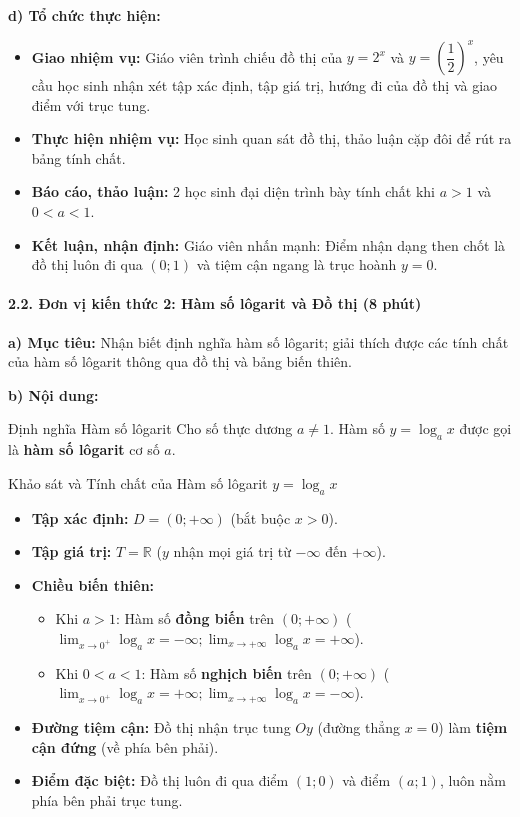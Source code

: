 \documentclass[12pt, a4paper]{article}
\begin{document}
\noindent \textbf{d) Tổ chức thực hiện:}
\begin{itemize}[leftmargin=0.6cm]
    \item \textbf{Giao nhiệm vụ:} Giáo viên trình chiếu đồ thị của $y = 2^x$ và $y = \left(\dfrac{1}{2}\right)^x$, yêu cầu học sinh nhận xét tập xác định, tập giá trị, hướng đi của đồ thị và giao điểm với trục tung.
    \item \textbf{Thực hiện nhiệm vụ:} Học sinh quan sát đồ thị, thảo luận cặp đôi để rút ra bảng tính chất.
    \item \textbf{Báo cáo, thảo luận:} 2 học sinh đại diện trình bày tính chất khi $a > 1$ và $0 < a < 1$.
    \item \textbf{Kết luận, nhận định:} Giáo viên nhấn mạnh: Điểm nhận dạng then chốt là đồ thị luôn đi qua $(0; 1)$ và tiệm cận ngang là trục hoành $y = 0$.
\end{itemize}

\paragraph{2.2. Đơn vị kiến thức 2: Hàm số lôgarit và Đồ thị (8 phút)}

\noindent \textbf{a) Mục tiêu:}
Nhận biết định nghĩa hàm số lôgarit; giải thích được các tính chất của hàm số lôgarit thông qua đồ thị và bảng biến thiên.

\noindent \textbf{b) Nội dung:}
\begin{pedabox}{Định nghĩa Hàm số lôgarit}
Cho số thực dương $a \neq 1$.
Hàm số $y = \log_a x$ được gọi là \textbf{hàm số lôgarit} cơ số $a$.
\end{pedabox}

\begin{pedabox}{Khảo sát và Tính chất của Hàm số lôgarit $y = \log_a x$}
\begin{itemize}[leftmargin=0.6cm]
    \item \textbf{Tập xác định:} $D = (0; +\infty)$ (bắt buộc $x > 0$).
    \item \textbf{Tập giá trị:} $T = \mathbb{R}$ ($y$ nhận mọi giá trị từ $-\infty$ đến $+\infty$).
    \item \textbf{Chiều biến thiên:}
    \begin{itemize}
        \item Khi $a > 1$: Hàm số \textbf{đồng biến} trên $(0; +\infty)$ ($\lim_{x \to 0^+} \log_a x = -\infty; \lim_{x \to +\infty} \log_a x = +\infty$).
        \item Khi $0 < a < 1$: Hàm số \textbf{nghịch biến} trên $(0; +\infty)$ ($\lim_{x \to 0^+} \log_a x = +\infty; \lim_{x \to +\infty} \log_a x = -\infty$).
    \end{itemize}
    \item \textbf{Đường tiệm cận:} Đồ thị nhận trục tung $Oy$ (đường thẳng $x = 0$) làm \textbf{tiệm cận đứng} (về phía bên phải).
    \item \textbf{Điểm đặc biệt:} Đồ thị luôn đi qua điểm $(1; 0)$ và điểm $(a; 1)$, luôn nằm phía bên phải trục tung.
\end{itemize}
\end{pedabox}
\end{document}
